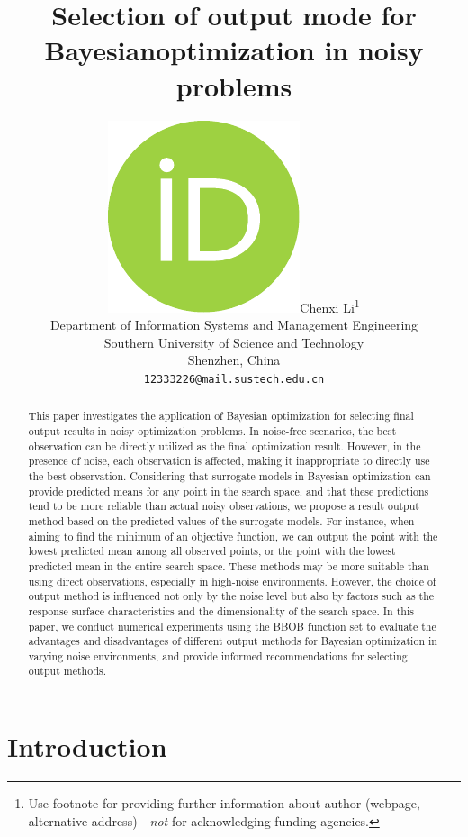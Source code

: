 \documentclass{article}
\title{Selection of output mode for Bayesianoptimization in noisy problems}
\author{ \href{https://orcid.org/0000-0000-0000-0000}{\includegraphics[scale=0.06]{orcid.pdf}\hspace{1mm}Chenxi Li}\thanks{Use footnote for providing further
		information about author (webpage, alternative
		address)---\emph{not} for acknowledging funding agencies.} \\
	Department of Information Systems and Management Engineering\\
	Southern University of Science and Technology\\
	Shenzhen, China\\
	\texttt{12333226@mail.sustech.edu.cn} \\
}
\begin{document}
\maketitle

\begin{abstract}
	\hspace{2em}This paper investigates the application of Bayesian optimization for selecting final output results in noisy optimization problems. In noise-free scenarios, the best observation can be directly utilized as the final optimization result. However, in the presence of noise, each observation is affected, making it inappropriate to directly use the best observation. Considering that surrogate models in Bayesian optimization can provide predicted means for any point in the search space, and that these predictions tend to be more reliable than actual noisy observations, we propose a result output method based on the predicted values of the surrogate models. For instance, when aiming to find the minimum of an objective function, we can output the point with the lowest predicted mean among all observed points, or the point with the lowest predicted mean in the entire search space. These methods may be more suitable than using direct observations, especially in high-noise environments. However, the choice of output method is influenced not only by the noise level but also by factors such as the response surface characteristics and the dimensionality of the search space. In this paper, we conduct numerical experiments using the BBOB function set to evaluate the advantages and disadvantages of different output methods for Bayesian optimization in varying noise environments, and provide informed recommendations for selecting output methods.

\end{abstract}





\section{Introduction}
\end{document}
